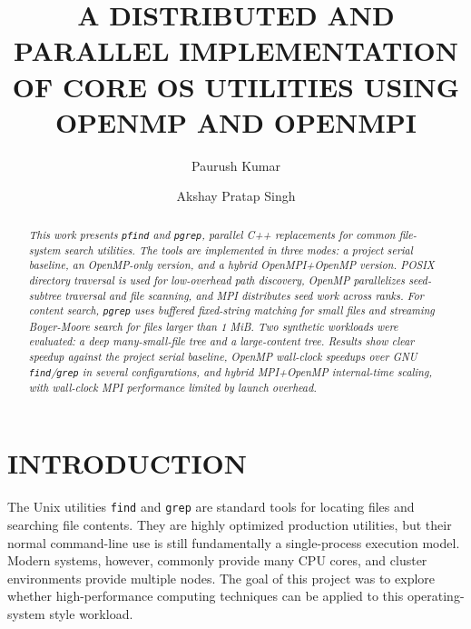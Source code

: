 \documentclass[twocolumn,10pt]{asme2e}
\title{A DISTRIBUTED AND PARALLEL IMPLEMENTATION OF CORE OS UTILITIES USING OPENMP AND OPENMPI}
\author{Paurush Kumar
    \affiliation{
    Roll No. NA22B002\\
    Indian Institute of Technology Madras\\
    Chennai, Tamil Nadu, India
    }
}
\author{Akshay Pratap Singh
    \affiliation{
    Roll No. CE21B006\\
    Indian Institute of Technology Madras\\
    Chennai, Tamil Nadu, India
    }
}
\begin{document}
\maketitle

\begin{abstract}
{\it This work presents \texttt{pfind} and \texttt{pgrep}, parallel C++ replacements for common file-system search utilities. The tools are implemented in three modes: a project serial baseline, an OpenMP-only version, and a hybrid OpenMPI+OpenMP version. POSIX directory traversal is used for low-overhead path discovery, OpenMP parallelizes seed-subtree traversal and file scanning, and MPI distributes seed work across ranks. For content search, \texttt{pgrep} uses buffered fixed-string matching for small files and streaming Boyer-Moore search for files larger than 1 MiB. Two synthetic workloads were evaluated: a deep many-small-file tree and a large-content tree. Results show clear speedup against the project serial baseline, OpenMP wall-clock speedups over GNU \texttt{find}/\texttt{grep} in several configurations, and hybrid MPI+OpenMP internal-time scaling, with wall-clock MPI performance limited by launch overhead.}
\end{abstract}

\begin{nomenclature}
\end{nomenclature}

\section*{INTRODUCTION}

The Unix utilities \texttt{find} and \texttt{grep} are standard tools for locating files and searching file contents. They are highly optimized production utilities, but their normal command-line use is still fundamentally a single-process execution model. Modern systems, however, commonly provide many CPU cores, and cluster environments provide multiple nodes. The goal of this project was to explore whether high-performance computing techniques can be applied to this operating-system style workload.
\end{document}
